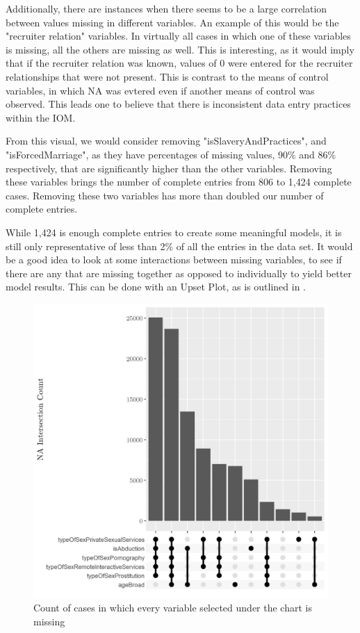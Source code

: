 \documentclass{article} %
\begin{document}
Additionally, there are instances when there seems to be a large correlation between values missing in different variables. An example of this would be the "recruiter relation" variables. In virtually all cases in which one of these variables is missing, all the others are missing as well. This is interesting, as it would imply that if the recruiter relation was known, values of 0 were entered for the recruiter relationships that were not present. This is contrast to the means of control variables, in which NA was evtered even if another means of control was observed. This leads one to believe that there is inconsistent data entry practices within the IOM.

From this visual, we would consider removing "isSlaveryAndPractices", and "isForcedMarriage", as they have percentages of missing values, 90\% and 86\% respectively, that are significantly higher than the other variables. Removing these variables brings the number of complete entries from 806 to 1,424 complete cases. Removing these two variables has more than doubled our number of complete entries.

While 1,424 is enough complete entries to create some meaningful models, it is still only representative of less than 2\% of all the entries in the data set. It would be a good idea to look at some interactions between missing variables, to see if there are any that are missing together as opposed to individually to yield better model results. This can be done with an Upset Plot, as is outlined in \cite{UpsetPlot}.

\begin{figure}[H]
	\includegraphics[width = \textwidth]{UpsetPlt1}
	\caption{Count of cases in which every variable selected under the chart is missing}
	\label{fig:IntersectionCount}
\end{figure}
\end{document}
